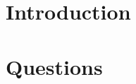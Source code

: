 \documentclass[12pt,twoside]{article}
\begin{document}



\section{Introduction}

\section{Questions}
\end{document}
